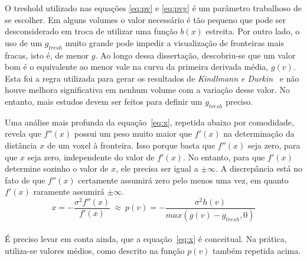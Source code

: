 	O treshold utilizado nas equações \eqref{eq:pv} e \eqref{eq:pvg} é um parâmetro trabalhoso de se escolher. Em alguns volumes o valor necessário é tão pequeno que pode ser desconsiderado em troca de utilizar uma função $ b(x) $ estreita. Por outro lado, o uso de um $ g_{tresh} $ muito grande pode impedir a visualização de fronteiras mais fracas, isto é, de menor $ g $. Ao longo dessa dissertação, descobriu-se que um valor bom é o equivalente ao menor vale na curva da primeira derivada média, $ g(v) $. Esta foi a regra utilizada para gerar os resultados de \textit{Kindlmann e Durkin}~\cite{gordon} e não houve melhora significativa em nenhum volume com a variação desse valor. No entanto, mais estudos devem ser feitos para definir um $ g_{tresh} $ preciso.
	
    Uma análise mais profunda da equação~\eqref{eq:x}, repetida abaixo por comodidade, revela que $ f''(x) $ possui um peso muito maior que $ f'(x) $ na determinação da distância $ x $ de um voxel à fronteira. Isso porque basta que $ f''(x) $ seja zero, para que $ x $ seja zero, independente do valor de $ f'(x) $. No entanto, para que $ f'(x) $ determine sozinho o valor de $ x $, ele precisa ser igual a $ \pm\infty $. A discrepância está no fato de que $ f''(x) $ certamente assumirá zero pelo menos uma vez, em quanto $ f'(x) $ raramente assumirá $ \pm\infty $.
    \\
    
\begin{equation} \label{eq:pvg}
	x = -\frac{\sigma^{2}f''(x)}{f'(x)} \ \approx \ 
	p(v) = -\frac{\sigma^{2}h(v)}{max(g(v) - g_{tresh}, 0)}
\end{equation} \\

    
    É preciso levar em conta ainda, que a equação~\eqref{eq:x} é conceitual. Na prática, utiliza-se valores médios, como descrito na função $ p(v) $ também repetida acima.